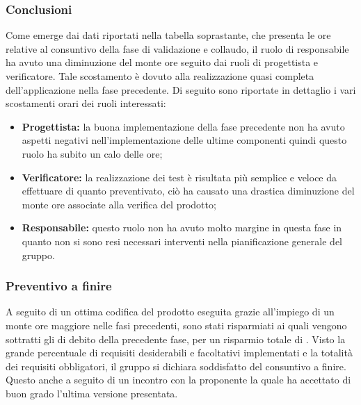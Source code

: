\subsubsection{Conclusioni}
Come emerge dai dati riportati nella tabella soprastante, che presenta le ore relative al consuntivo della fase di validazione e collaudo, il ruolo di responsabile ha avuto una diminuzione del monte ore seguito dai ruoli di progettista e verificatore. Tale scostamento è dovuto alla realizzazione quasi completa dell'applicazione nella fase precedente. Di seguito sono riportate in dettaglio i vari scostamenti orari dei ruoli interessati:
\begin{itemize}
	\item \textbf{Progettista:} la buona implementazione della fase precedente non ha avuto aspetti negativi nell'implementazione delle ultime componenti quindi questo ruolo ha subito un calo delle ore; 
	\item \textbf{Verificatore:} la realizzazione dei test è risultata più semplice e veloce da effettuare di quanto preventivato, ciò ha causato una drastica diminuzione del monte ore associate alla verifica del prodotto;
	\item \textbf{Responsabile:} questo ruolo non ha avuto molto margine in questa fase in quanto non si sono resi necessari interventi nella pianificazione generale del gruppo.
\end{itemize}

\subsubsection{Preventivo a finire}
A seguito di un ottima codifica del prodotto eseguita grazie all'impiego di un monte ore maggiore nelle fasi precedenti, sono stati risparmiati  ai quali vengono sottratti gli  di debito della precedente fase, per un risparmio totale di . Visto la grande percentuale di requisiti desiderabili e facoltativi implementati e la totalità dei requisiti obbligatori, il gruppo si dichiara soddisfatto del consuntivo a finire. Questo anche a seguito di un incontro con la proponente la quale ha accettato di buon grado l'ultima versione presentata.


